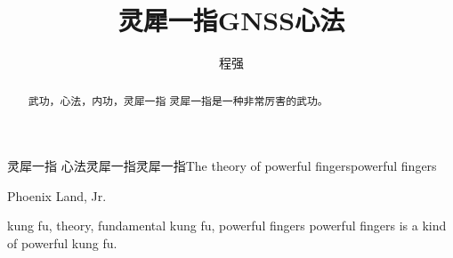 \title{灵犀一指GNSS心法}{灵犀一指  心法}{灵犀一指}{灵犀一指}{The theory of powerful fingers}{powerful fingers}
\author{程强}{Phoenix Land, Jr.}
\authorizedate{\today}
\makebigcover
\makecover
\begin{abstract}{武功，心法，内功，灵犀一指}
    灵犀一指是一种非常厉害的武功。
\end{abstract}

\begin{englishabstract}{kung fu, theory, fundamental kung fu, powerful fingers}
    powerful fingers is a kind of powerful kung fu.
\end{englishabstract}

\tableofcontents
\listofothers
